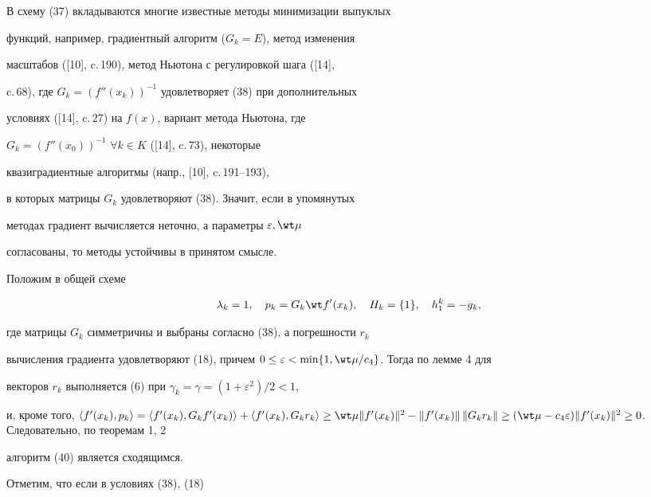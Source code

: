 В схему (37) вкладываются многие известные методы минимизации выпуклых


функций, например, градиентный алгоритм ($G_k=E$), метод изменения


масштабов ([10], c.\,190), метод Ньютона с регулировкой шага ([14],


c.\,68), где $G_k=({f}''(x_k))^{-1}$ удовлетворяет (38) при дополнительных


условиях ([14], c.\,27) на $f(x)$, вариант метода Ньютона, где


$G_k=({f}''(x_0))^{-1}$ $\forall k\in K$ ([14], c.\,73), некоторые


квазиградиентные алгоритмы (напр., [10], c.\,191--193),


в которых матрицы $G_k$ удовлетворяют (38). Значит, если в упомянутых


методах градиент вычисляется неточно, а параметры $\varepsilon,\wt\mu$


согласованы, то методы устойчивы в принятом смысле.





Положим в общей схеме


\begin{equation}


\lambda_k=1,\quad p_k=G_k{\wt f}'(x_k),\quad H_k=\{1\},\quad h_1^k=-g_k,


\end{equation}


где матрицы $G_k$ симметричны и выбраны согласно (38), а погрешности $r_k$


вычисления градиента удовлетворяют (18), причем $0\le\varepsilon


<\min\{{1,\wt\mu /c_4}\}$. Тогда по лемме 4 для


векторов $r_k$ выполняется (6) при $\gamma_k=\gamma=(1+\varepsilon^2)/2<1$,


и, кроме того, $\langle {{f}'(x_k),p_k}\rangle =\langle


{{f}'(x_k),G_k{f}'(x_k)}\rangle+\langle {{f}'(x_k),G_kr_k}\rangle


\ge\wt\mu\|{{f}'(x_k)}\|^2-\|{{f}'(x_k)}\|\,


\|{G_kr_k}\|\ge (\wt\mu -c_4\varepsilon)\|


{{f}'(x_k)}\|^2\ge 0$. Следовательно, по теоремам 1, 2


алгоритм (40) является сходящимся.


Отметим, что если в условиях (38), (18)


